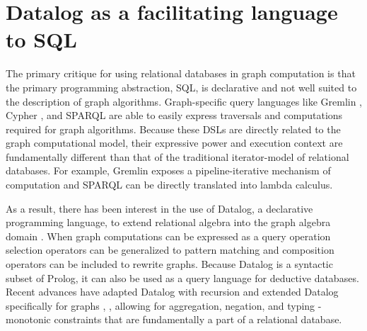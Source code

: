 \documentclass[11pt,letterpaper]{article}
\begin{document}
%

\section*{Datalog as a facilitating language to SQL}

The primary critique for using relational databases in graph computation is that the primary programming abstraction, SQL, is declarative and not well suited to the description of graph algorithms. Graph-specific query languages like Gremlin \cite{rodriguez_gremlin_2013}, Cypher \cite{miller_graph_2013}, and SPARQL \cite{prudhommeaux_sparql_2008} are able to easily express traversals and computations required for graph algorithms. Because these DSLs are directly related to the graph computational model, their expressive power and execution context are fundamentally different than that of the traditional iterator-model of relational databases. For example, Gremlin exposes a pipeline-iterative mechanism of computation and SPARQL can be directly translated into lambda calculus.

As a result, there has been interest in the use of Datalog, a declarative programming language, to extend relational algebra into the graph algebra domain \cite{he_graphs-at--time:_2008}. When graph computations can be expressed as a query operation selection operators can be generalized to pattern matching and composition operators can be included to rewrite graphs. Because Datalog is a syntactic subset of Prolog, it can also be used as a query language for deductive databases. Recent advances have adapted Datalog with recursion and extended Datalog specifically for graphs \cite{shkapsky_graph_2013}, \cite{green_datalog_2013}, allowing for aggregation, negation, and typing - monotonic constraints that are fundamentally a part of a relational database.
\end{document}
